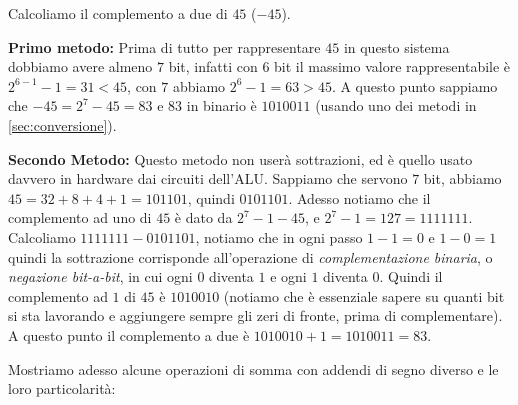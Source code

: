 \begin{ex} Calcoliamo il complemento a due di $45$ ($-45$).

\noindent \textbf{Primo metodo:} Prima di tutto per rappresentare $45$ in
questo sistema dobbiamo avere almeno $7$ bit, infatti con $6$ bit il massimo
valore rappresentabile è $2^{6-1}-1 = 31 < 45$, con $7$ abbiamo $2^6-1 =
63>45$. A questo punto sappiamo che $-45 = 2^7-45 = 83$ e $83$ in binario è
$1010011$ (usando uno dei metodi in \ref{sec:conversione}).\medskip

\noindent \textbf{Secondo Metodo:} Questo metodo non userà sottrazioni, ed è
quello usato davvero in hardware dai circuiti dell'ALU. Sappiamo che servono
$7$ bit, abbiamo $45 = 32+8+4+1 = 101101$, quindi $0101101$. Adesso notiamo che
il complemento ad uno di $45$ è dato da $2^7-1-45$, e $2^7-1 = 127 = 1111111$.
Calcoliamo $1111111-0101101$, notiamo che in ogni passo $1-1=0$ e $1-0=1$
quindi la sottrazione corrisponde all'operazione di \emph{complementazione
binaria}, o \emph{negazione bit-a-bit}, in cui ogni $0$ diventa $1$ e ogni $1$
diventa $0$. Quindi il complemento ad $1$ di $45$ è $1010010$ (notiamo che è
essenziale sapere su quanti bit si sta lavorando e aggiungere sempre gli zeri
di fronte, prima di complementare). A questo punto il complemento a due è
$1010010+1 = 1010011 = 83$. \end{ex}

Mostriamo adesso alcune operazioni di somma con addendi di segno diverso e le
loro particolarità: 

